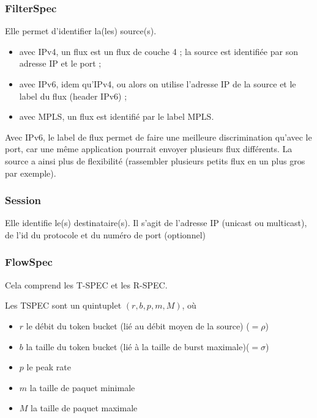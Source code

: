 			\subsubsection{FilterSpec}
			
			Elle permet d'identifier la(les) source(s).
			
			\begin{itemize}
				\item avec IPv4, un flux est un flux de couche 4 ; la source est identifiée par son adresse IP et le port ;
				\item avec IPv6, idem qu'IPv4, ou alors on utilise l'adresse IP de la source et le label du flux (header IPv6) ;
				
				\item avec MPLS, un flux est identifié par le label MPLS.
			\end{itemize}
			
			Avec IPv6, le label de flux permet de faire une meilleure discrimination qu'avec le port, car une même application pourrait envoyer plusieurs flux différents. La source a ainsi plus de flexibilité (rassembler plusieurs petits flux en un plus gros par exemple).
			
			\subsubsection{Session}
			
			Elle identifie le(s) destinataire(s). Il s'agit de l'adresse IP (unicast ou multicast), de l'id du protocole et du numéro de port (optionnel)
			
			\subsubsection{FlowSpec}
		
			Cela comprend les T-SPEC et les R-SPEC.
			
			Les TSPEC sont un quintuplet $(r, b, p, m, M)$, où
			
			\begin{itemize}
				\item $r$ le débit du token bucket (lié au débit moyen de la source) ($= \rho$)
				\item $b$ la taille du token bucket (lié à la taille de burst maximale)($= \sigma$)
				\item $p$ le peak rate
				\item $m$ la taille de paquet minimale
				\item $M$ la taille de paquet maximale
			\end{itemize}
			
